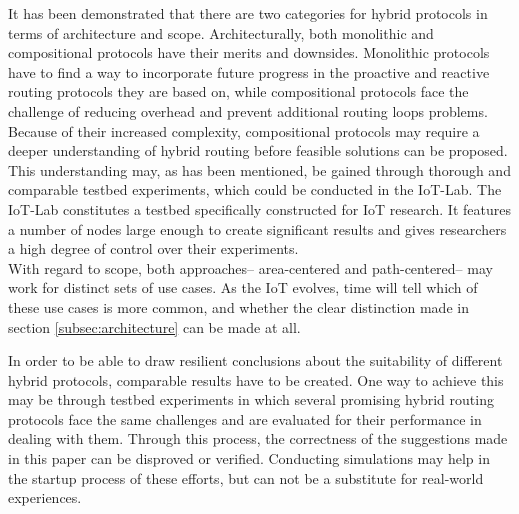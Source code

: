 \documentclass[a4paper,10pt]{scrartcl}
\begin{document}
It has been demonstrated that there are two categories for hybrid protocols in terms of architecture and scope. 
Architecturally, both monolithic and compositional protocols have their merits and downsides. Monolithic protocols have to find a way to incorporate future progress in the proactive and reactive routing protocols they are based on, while compositional protocols face the challenge of reducing overhead and prevent additional routing loops problems. Because of their increased complexity, compositional protocols may require a deeper understanding of hybrid routing before feasible solutions can be proposed. This understanding may, as has been mentioned, be gained through thorough and comparable testbed experiments, which could be conducted in the IoT-Lab. The IoT-Lab constitutes a testbed specifically constructed for IoT research. It features a number of nodes large enough to create significant results and gives researchers a high degree of control over their experiments.\\
With regard to scope, both approaches-- area-centered and path-centered-- may work for distinct sets of use cases. As the IoT evolves, time will tell which of these use cases is more common, and whether the clear distinction made in section \ref{subsec:architecture} can be made at all. 

In order to be able to draw resilient conclusions about the suitability of different hybrid protocols, comparable results have to be created. One way to achieve this may be through testbed experiments in which several promising hybrid routing protocols face the same challenges and are evaluated for their performance in dealing with them. Through this process, the correctness of the suggestions made in this paper can be disproved or verified.
Conducting simulations may help in the startup process of these efforts, but can not be a substitute for real-world experiences.\\




\printglossaries

{\small


}
\end{document}
